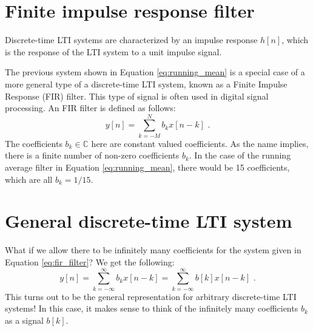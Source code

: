 \section{Finite impulse response filter}
\begin{marginfigure}

\begin{center}
\end{center}
\caption{Discrete-time LTI systems are characterized by an impulse response $h[n]$, which is the response of the LTI system to a unit impulse signal.}
\end{marginfigure}

The previous system shown in Equation \ref{eq:running_mean} is a special case of a more general type of a discrete-time LTI system, known as a Finite Impulse Response (FIR) filter. This type of signal is often used in digital signal processing. An FIR filter is defined as follows:
\begin{equation}
  \boxed{
    y[n] = \sum_{k=-M}^{N} b_k x[n-k]\,\,.
  }
  \label{eq:fir_filter}
\end{equation}
The coefficients $b_k \in \mathbb{C}$ here are constant valued coefficients. As the name implies, there is a finite number of non-zero coefficients $b_k$. In the case of the running average filter in Equation \ref{eq:running_mean}, there would be 15 coefficients, which are all $b_k=1/15$.

\section{General discrete-time LTI system}
What if we allow there to be infinitely many coefficients for the system given in Equation \ref{eq:fir_filter}? We get the following:
\begin{equation}
    y[n] = \sum_{k=-\infty}^{\infty} b_k x[n-k] = \sum_{k=-\infty}^{\infty} b[k] x[n-k]\,\,.
\end{equation}
This turns out to be the general representation for arbitrary discrete-time LTI systems! In this case, it makes sense to think of the infinitely many coefficients $b_k$ as a signal $b[k]$.


